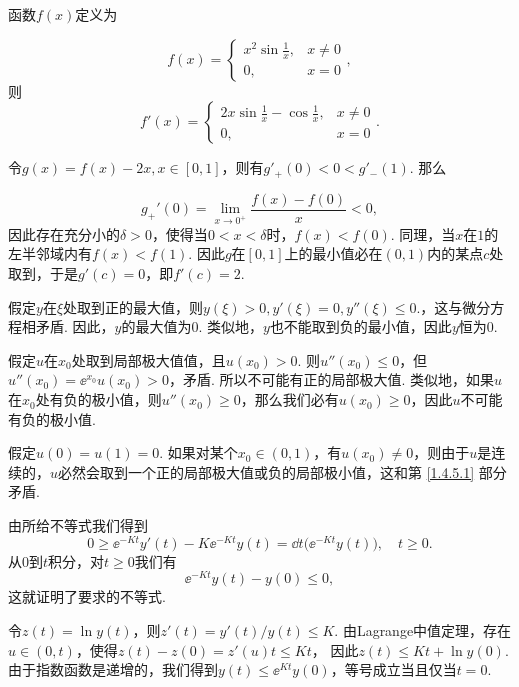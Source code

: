 \begin{ans}
  \begin{enumb}
    \item 函数$f(x)$定义为
  \end{enumb}
  \[
    f(x) = \begin{cases}
      x^2\sin\frac1x, & x\ne 0\\
      0, & x=0
    \end{cases},
  \]
  则
  \[
    f'(x)= \begin{cases}
      2x\sin\frac1x - \cos\frac1x, & x\ne0\\
      0, & x=0
    \end{cases}.
  \]
  \begin{enumb}\setcounter{enumi}{1}
    \item 令$g(x)= f(x)-2x,x\in[0,1]$，则有$g'_+(0)<0<g'_-(1)$. 那么
  \end{enumb}
        \[
          g_+'(0) = \lim_{x\to 0^+}\frac{f(x)-f(0)}{x}<0,
        \]
        因此存在充分小的$\delta>0$，使得当$0<x<\delta$时，$f(x)<f(0)$. 同理，当$x$在$1$的左半邻域内有$f(x)<f(1)$. 因此$g$在$[0,1]$上的最小值必在$(0,1)$内的某点$c$处取到，于是$g'(c)=0$，即$f'(c)=2$.
\end{ans}

\begin{ans}
  假定$y$在$\xi$处取到正的最大值，则$y(\xi)>0,y'(\xi)=0,y''(\xi)\le0$.，这与微分方程相矛盾. 因此，$y$的最大值为$0$. 类似地，$y$也不能取到负的最小值，因此$y$恒为0.
\end{ans}

\begin{ans}
  \begin{enumb}
    \item 假定$u$在$x_0$处取到局部极大值值，且$u(x_0)>0$. 则$u''(x_0)\le0$，但$u''(x_0)=\ee^{x_0}u(x_0)>0$，矛盾. 所以不可能有正的局部极大值. 类似地，如果$u$在$x_0$处有负的极小值，则$u''(x_0)\ge0$，那么我们必有$u(x_0)\ge0$，因此$u$不可能有负的极小值.
    \item 假定$u(0)=u(1)=0$. 如果对某个$x_0\in(0,1)$，有$u(x_0)\ne0$，则由于$u$是连续的，$u$必然会取到一个正的局部极大值或负的局部极小值，这和第 \ref{1.4.5.1} 部分矛盾.
  \end{enumb}
\end{ans}

\begin{ans}
  \method 由所给不等式我们得到
  \[
    0\ge \ee^{-Kt}y'(t) - K\ee^{-Kt}y(t)
    =\dd{}t\Big( \ee^{-Kt}y(t) \Big),\quad t\ge 0.
  \]
  从$0$到$t$积分，对$t\ge0$我们有
  \[
    \ee^{-Kt}y(t)-y(0)\le 0,
  \]
  这就证明了要求的不等式.

  \method 令$z(t)=\ln y(t)$，则$z'(t)=y'(t)/y(t)\le K$. 由Lagrange中值定理，存在$u\in(0,t)$，使得$z(t)-z(0)=z'(u)t\le Kt$， 因此$z(t)\le Kt+\ln y(0)$. 由于指数函数是递增的，我们得到$y(t)\le \ee^{Kt}y(0)$，等号成立当且仅当$t=0$.
\end{ans}

